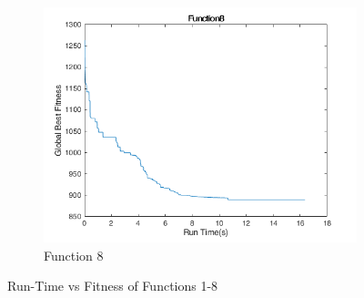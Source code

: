 \begin{figure}
\begin{subfigure}[b]{0.4\textwidth}
    \includegraphics[width=\textwidth]{img/cecrt/f8}
    \caption{Function 8}
  \end{subfigure}
  \caption{Run-Time vs Fitness of Functions 1-8}
\end{figure}

\clearpage

